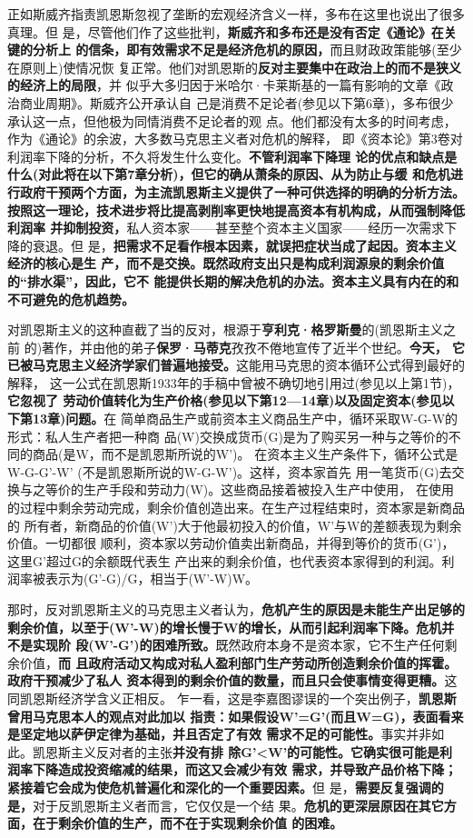 正如斯威齐指责凯恩斯忽视了垄断的宏观经济含义一样，多布在这里也说出了很多真理。但
是，尽管他们作了这些批判，\textbf{斯威齐和多布还是没有否定《通论》在关键的分析上
  的信条，即有效需求不足是经济危机的原因，}而且财政政策能够(至少在原则上)使情况恢
复正常。他们对凯恩斯的\textbf{反对主要集中在政治上的而不是狭义的经济上的局限}，并
似乎大多归因于米哈尔·卡莱斯基的一篇有影响的文章《政治商业周期》。斯威齐公开承认自
己是消费不足论者(参见以下第6章)，多布很少承认这一点，但他极为同情消费不足论者的观
点。他们都没有太多的时间考虑，作为《通论》的余波，大多数马克思主义者对危机的解释，
即《资本论》第3卷对利润率下降的分析，不久将发生什么变化。\textbf{不管利润率下降理
  论的优点和缺点是什么(对此将在以下第7章分析)，但它的确从萧条的原因、从为防止与缓
  和危机进行政府干预两个方面，为主流凯恩斯主义提供了一种可供选择的明确的分析方法。
  按照这一理论，技术进步将比提高剥削率更快地提高资本有机构成，从而强制降低利润率
  并抑制投资，}私人资本家——甚至整个资本主义国家——经历一次需求下降的衰退。但
是，\textbf{把需求不足看作根本因素，就误把症状当成了起因。资本主义经济的核心是生
  产，而不是交换。既然政府支出只是构成利润源泉的剩余价值的“排水渠”，因此，它不
  能提供长期的解决危机的办法。资本主义具有内在的和不可避免的危机趋势。}

对凯恩斯主义的这种直截了当的反对，根源于\textbf{亨利克·格罗斯曼}的(凯恩斯主义之前
的)著作，并由他的弟子\textbf{保罗·马蒂克}孜孜不倦地宣传了近半个世纪。\textbf{今天，
  它已被马克思主义经济学家们普遍地接受。}这能用马克思的资本循环公式得到最好的解释，
这一公式在凯恩斯1933年的手稿中曾被不确切地引用过(参见以上第1节)，\textbf{它忽视了
  劳动价值转化为生产价格(参见以下第12—14章)以及固定资本(参见以下第13章)问题。}在
简单商品生产或前资本主义商品生产中，循环采取W-G-W的形式：私人生产者把一种商
品(W)交换成货币(G)是为了购买另一种与之等价的不同的商品(是W，而不是凯恩斯所说的W')。
在资本主义生产条件下，循环公式是W-G-G'-W' (不是凯恩斯所说的W-G-W')。这样，资本家首先
用一笔货币(G)去交换与之等价的生产手段和劳动力(W)。这些商品接着被投入生产中使用，
在使用的过程中剩余劳动完成，剩余价值创造出来。在生产过程结束时，资本家是新商品的
所有者，新商品的价值(W')大于他最初投入的价值，W'与W的差额表现为剩余价值。一切都很
顺利，资本家以劳动价值卖出新商品，并得到等价的货币(G')，这里G'超过G的余额既代表生
产出来的剩余价值，也代表资本家得到的利润。利润率被表示为(G'-G)/G，相当于(W'-W)W。

那时，反对凯恩斯主义的马克思主义者认为，\textbf{危机产生的原因是未能生产出足够的
  剩余价值，以至于(W'-W)的增长慢于W的增长，从而引起利润率下降。危机并不是实现阶
  段(W'-G')的困难所致。}既然政府本身不是资本家，它不生产任何剩余价值，\textbf{而
  且政府活动又构成对私人盈利部门生产劳动所创造剩余价值的挥霍。政府干预减少了私人
  资本得到的剩余价值的数量，而且只会使事情变得更糟。}这同凯恩斯经济学含义正相反。
乍一看，这是李嘉图谬误的一个突出例子，\textbf{凯恩斯曾用马克思本人的观点对此加以
  指责：如果假设W'=G'(而且W=G)，表面看来是坚定地以萨伊定律为基础，并且否定了有效
  需求不足的可能性。}事实并非如此。凯恩斯主义反对者的主张\textbf{并没有排
  除G'<W'的可能性。它确实很可能是利润率下降造成投资缩减的结果，而这又会减少有效
需求，并导致产品价格下降；紧接着它会成为使危机普遍化和深化的一个重要因素。}但
是，\textbf{需要反复强调的是，}对于反凯恩斯主义者而言，它仅仅是一个结
果。\textbf{危机的更深层原因在其它方面，在于剩余价值的生产，而不在于实现剩余价值
  的困难。}

